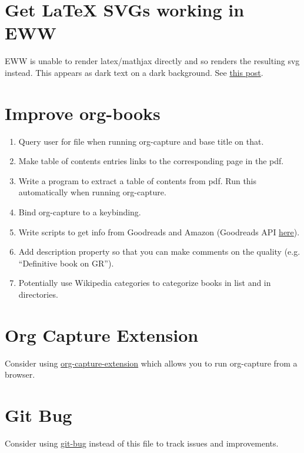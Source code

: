 \documentclass{default}
\begin{document}
\section{Get LaTeX SVGs working in EWW}

EWW is unable to render latex/mathjax directly and so renders the resulting svg instead. This
appears as dark text on a dark background. See
\href{https://emacs.stackexchange.com/questions/3622/use-a-different-color-theme-for-eww-buffers}{this
  post}.

\section{Improve org-books}

\begin{enumerate}
\item Query user for file when running org-capture and base title on that.
\item Make table of contents entries links to the corresponding page in the pdf.
\item Write a program to extract a table of contents from pdf. Run this automatically when running
  org-capture.
\item Bind org-capture to a keybinding.
\item Write scripts to get info from Goodreads and Amazon (Goodreads API
  \href{https://www.goodreads.com/api}{here}).
\item Add description property so that you can make comments on the quality (e.g. ``Definitive book
  on GR'').
\item Potentially use Wikipedia categories to categorize books in list and in directories.
\end{enumerate}

\section{Org Capture Extension}

Consider using \href{https://github.com/sprig/org-capture-extension}{org-capture-extension} which
allows you to run org-capture from a browser.

\section{Git Bug}

Consider using \href{https://github.com/MichaelMure/git-bug}{git-bug} instead of this file to track
issues and improvements.
\end{document}
